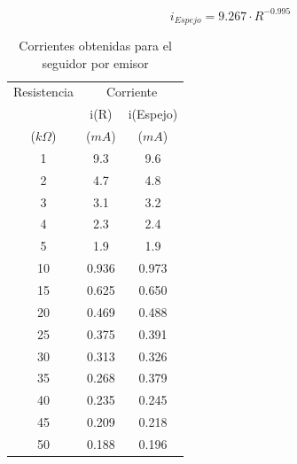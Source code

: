 \begin{equation}\label{corriente_espejo_seguidor}
i_{Espejo}=9.267\cdot R^{-0.995}
\end{equation}

\begin{table}[H]
\centering
\caption{Corrientes obtenidas para el seguidor por emisor}
\label{espejodiferencialbjt}
\begin{tabular}{ccc}
\hline 
Resistencia          & \multicolumn{2}{c}{Corriente}                \\
                     & i(R)                 & i(Espejo)             \\
($k\Omega$)          & ($mA$)               & ($mA$)                 \\
\hline 
\hline 
1	&	9.3	&	9.6	\\
2	&	4.7	&	4.8	\\
3	&	3.1	&	3.2	\\
4	&	2.3	&	2.4	\\
5	&	1.9	&	1.9	\\
10	&	0.936	&	0.973	\\
15	&	0.625	&	0.650	\\
20	&	0.469	&	0.488	\\
25	&	0.375	&	0.391	\\
30	&	0.313	&	0.326	\\
35	&	0.268	&	0.379	\\
40	&	0.235	&	0.245	\\
45	&	0.209	&	0.218	\\
50	&	0.188	&	0.196	\\
\hline 
\end{tabular}
\end{table}

